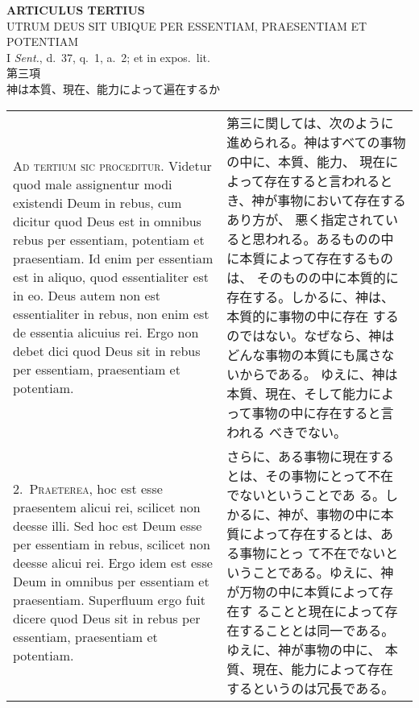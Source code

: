\documentclass[10pt]{jsarticle} %
\begin{document}
\begin{center}
 {\Large {\bf ARTICULUS TERTIUS}}\\
 {\large UTRUM DEUS SIT UBIQUE PER ESSENTIAM, PRAESENTIAM ET POTENTIAM}\\
 {\footnotesize I {\itshape Sent.}, d.~37, q.~1, a.~2; et in expos.~lit.}\\
 {\Large 第三項\\神は本質、現在、能力によって遍在するか}
\end{center}

\begin{longtable}{p{21em}p{21em}}



{\huge A}{\scshape d tertium sic proceditur}. Videtur quod male assignentur modi
 existendi Deum in rebus, cum dicitur quod Deus est in omnibus rebus per
 essentiam, potentiam et praesentiam. Id enim per essentiam est in
 aliquo, quod essentialiter est in eo. Deus autem non est essentialiter
 in rebus, non enim est de essentia alicuius rei. Ergo non debet dici
 quod Deus sit in rebus per essentiam, praesentiam et potentiam.

&

第三に関しては、次のように進められる。神はすべての事物の中に、本質、能力、
 現在によって存在すると言われるとき、神が事物において存在するあり方が、
 悪く指定されていると思われる。あるものの中に本質によって存在するものは、
 そのものの中に本質的に存在する。しかるに、神は、本質的に事物の中に存在
 するのではない。なぜなら、神はどんな事物の本質にも属さないからである。
 ゆえに、神は本質、現在、そして能力によって事物の中に存在すると言われる
 べきでない。

\\


2.~{\scshape Praeterea}, hoc est esse praesentem alicui rei, scilicet non
 deesse illi. Sed hoc est Deum esse per essentiam in rebus, scilicet non
 deesse alicui rei. Ergo idem est esse Deum in omnibus per essentiam et
 praesentiam. Superfluum ergo fuit dicere quod Deus sit in rebus per
 essentiam, praesentiam et potentiam.

&

さらに、ある事物に現在するとは、その事物にとって不在でないということであ
 る。しかるに、神が、事物の中に本質によって存在するとは、ある事物にとっ
 て不在でないということである。ゆえに、神が万物の中に本質によって存在す
 ることと現在によって存在することとは同一である。ゆえに、神が事物の中に、
 本質、現在、能力によって存在するというのは冗長である。

\\


\end{longtable}
\end{document}
